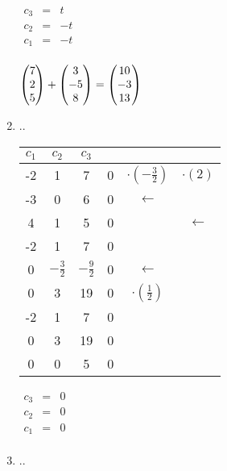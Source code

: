\begin{enumerate}
						
						
							$\begin{array} {ccc}
								c_3 & = & t\\
								c_2 & = & -t\\
								c_1 & = & -t\\
							\end{array}$
						
						
						
							$\mvect{7\\2\\5} + \mvect{3\\-5\\8} = \mvect{10\\-3\\13}$
						
						
				    \item ..
				    	
							\begin{tabular} {ccc|ccc}
								$c_1$ & $c_2$ & $c_3$ & & &\\
								\hline
								-2 & 1 & 7 & 0 & $\cdot(-\frac{3}{2})$ & $\cdot(2)$ \\
								-3 & 0 & 6 & 0 & $\leftarrow$ & \\
								4 & 1 & 5 & 0 & & $\leftarrow$ \\
								\hline
								-2 & 1 & 7 & 0 & & \\
								0 & $-\frac{3}{2}$ & $-\frac{9}{2}$ & 0 & $\leftarrow$ & \\
								0 & 3 & 19 & 0 & $\cdot(\frac{1}{2})$ & \\
								\hline
								-2 & 1 & 7 & 0 & & \\
								0 & 3 & 19 & 0 & & \\
								0 & 0 & 5 & 0 & & \\
							\end{tabular}
						
						
						
							$\begin{array} {ccc}
								c_3 & = & 0\\
								c_2 & = & 0\\
								c_1 & = & 0\\
							\end{array}$
						

				    \item ..
				  		

\end{enumerate}
